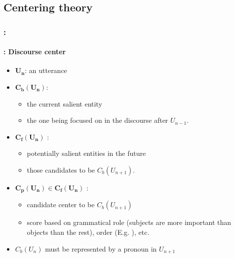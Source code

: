 \documentclass[xcolor=table]{beamer}
\begin{document}
\subsection{Centering theory}

\begin{frame}
	\frametitle{\insertshortsubtitle: \insertsection}
	\framesubtitle{\insertsubsection: Discourse center}
	
	\begin{itemize}
		\item $\mathbf{U_n}$: an utterance
		\item $\mathbf{C_b(U_n)}$: 
		\begin{itemize}
			\item the current salient entity
			\item the one being focused on in the discourse after $ U_{n-1} $.
		\end{itemize}
		\item $\mathbf{C_f(U_n)}$ : 
		\begin{itemize}
			\item potentially salient entities in the future
			\item those candidates to be $C_b(U_{n+1})$.
		\end{itemize}
		\item $\mathbf{C_p(U_n) \in C_f(U_n)}$ : 
		\begin{itemize}
			\item candidate center to be $C_b(U_{n+1})$
			\item score based on grammatical role (subjects are more important than objects than the rest), order (E.g. ), etc.
		\end{itemize}
		\item $C_b(U_n)$ must be represented by a pronoun in $U_{n+1}$
	\end{itemize}
	
\end{frame}
\end{document}
